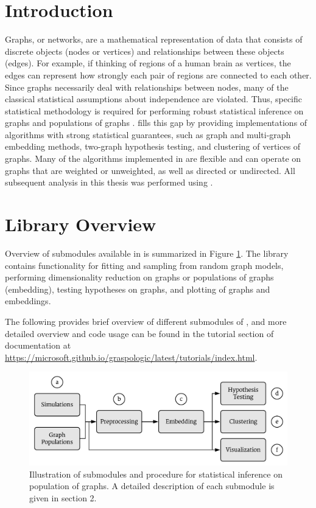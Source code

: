 \section{Introduction}
Graphs, or networks, are a mathematical representation of data that consists of discrete objects (nodes or vertices) and relationships between these objects (edges). For example, if thinking of regions of a human brain as vertices, the edges can represent how strongly each pair of regions are connected to each other. 
Since graphs necessarily deal with relationships between nodes, many of the classical statistical assumptions about independence are violated. Thus, specific statistical methodology is required for performing robust statistical inference on graphs and populations of graphs \cite{survey-rdpg}. \graspy fills this gap by providing implementations of algorithms with strong statistical guarantees, such as graph and multi-graph embedding methods, two-graph hypothesis testing, and clustering of vertices of graphs. Many of the algorithms implemented in \graspy are flexible and can operate on graphs that are weighted or unweighted, as well as directed or undirected. All subsequent analysis in this thesis was performed using \graspy.

\section{Library Overview}
Overview of submodules available in \graspy is summarized in Figure \ref{fig:graspy}. The library contains functionality for fitting and sampling from random graph models, performing dimensionality reduction on graphs or populations of graphs (embedding), testing hypotheses on graphs, and plotting of graphs and embeddings.

The following provides brief overview of different submodules of \graspy, and more detailed overview and code usage can be found in the tutorial section of \graspy documentation at \url{https://microsoft.github.io/graspologic/latest/tutorials/index.html}.

\begin{figure}[t]
    \centering
    \includegraphics[width=.8\linewidth]{figures/graspy/graspy.pdf}
    \caption{Illustration of submodules and procedure for statistical inference on population of graphs. A detailed description of each submodule is given in section 2.}
    \label{fig:graspy}
\end{figure}


